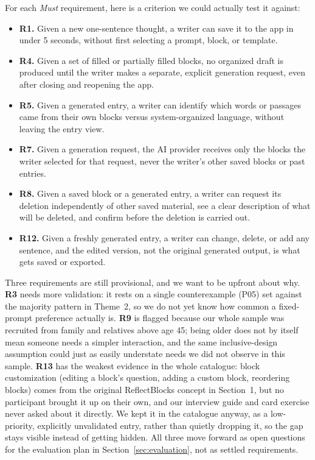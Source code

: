 \documentclass[sigconf,nonacm]{acmart}
\begin{document}
For each \textit{Must} requirement, here is a criterion we could actually
test it against:
\begin{itemize}
  \item \textbf{R1.} Given a new one-sentence thought, a writer can save it
  to the app in under 5 seconds, without first selecting a prompt, block, or
  template.
  \item \textbf{R4.} Given a set of filled or partially filled blocks, no
  organized draft is produced until the writer makes a separate, explicit
  generation request, even after closing and reopening the app.
  \item \textbf{R5.} Given a generated entry, a writer can identify which
  words or passages came from their own blocks versus system-organized
  language, without leaving the entry view.
  \item \textbf{R7.} Given a generation request, the AI provider receives
  only the blocks the writer selected for that request, never the writer's
  other saved blocks or past entries.
  \item \textbf{R8.} Given a saved block or a generated entry, a writer can
  request its deletion independently of other saved material, see a clear
  description of what will be deleted, and confirm before the deletion is
  carried out.
  \item \textbf{R12.} Given a freshly generated entry, a writer can change,
  delete, or add any sentence, and the edited version, not the original
  generated output, is what gets saved or exported.
\end{itemize}

Three requirements are still provisional, and we want to be upfront about
why. \textbf{R3} needs more validation: it rests on a single counterexample
(P05) set against the majority pattern in Theme~2, so we do not yet know how
common a fixed-prompt preference actually is. \textbf{R9} is flagged because
our whole sample was recruited from family and relatives above age 45; being
older does not by itself mean someone needs a simpler interaction, and the
same inclusive-design assumption could just as easily understate needs we
did not observe in this sample. \textbf{R13} has the weakest evidence in the
whole catalogue: block customization (editing a block's question, adding a
custom block, reordering blocks) comes from the original ReflectBlocks
concept in Section~1, but no participant brought it up on their own, and our
interview guide and card exercise never asked about it directly. We kept it
in the catalogue anyway, as a low-priority, explicitly unvalidated entry,
rather than quietly dropping it, so the gap stays visible instead of getting
hidden. All three move forward as open questions for the evaluation plan in
Section~\ref{sec:evaluation}, not as settled requirements.
\end{document}
